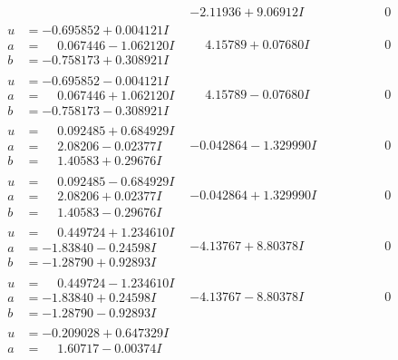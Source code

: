 \documentclass[1p]{elsarticle_modified}
\theoremstyle{definition}
\begin{document}
$$\begin{array}{c|c|c}
 & -2.11936 + 9.06912 I & \phantom{-0.000000 } 0 \\ \hline\begin{aligned}
u &= -0.695852 + 0.004121 I \\
a &= \phantom{-}0.067446 - 1.062120 I \\
b &= -0.758173 + 0.308921 I\end{aligned}
 & \phantom{-}4.15789 + 0.07680 I & \phantom{-0.000000 } 0 \\ \hline\begin{aligned}
u &= -0.695852 - 0.004121 I \\
a &= \phantom{-}0.067446 + 1.062120 I \\
b &= -0.758173 - 0.308921 I\end{aligned}
 & \phantom{-}4.15789 - 0.07680 I & \phantom{-0.000000 } 0 \\ \hline\begin{aligned}
u &= \phantom{-}0.092485 + 0.684929 I \\
a &= \phantom{-}2.08206 - 0.02377 I \\
b &= \phantom{-}1.40583 + 0.29676 I\end{aligned}
 & -0.042864 - 1.329990 I & \phantom{-0.000000 } 0 \\ \hline\begin{aligned}
u &= \phantom{-}0.092485 - 0.684929 I \\
a &= \phantom{-}2.08206 + 0.02377 I \\
b &= \phantom{-}1.40583 - 0.29676 I\end{aligned}
 & -0.042864 + 1.329990 I & \phantom{-0.000000 } 0 \\ \hline\begin{aligned}
u &= \phantom{-}0.449724 + 1.234610 I \\
a &= -1.83840 - 0.24598 I \\
b &= -1.28790 + 0.92893 I\end{aligned}
 & -4.13767 + 8.80378 I & \phantom{-0.000000 } 0 \\ \hline\begin{aligned}
u &= \phantom{-}0.449724 - 1.234610 I \\
a &= -1.83840 + 0.24598 I \\
b &= -1.28790 - 0.92893 I\end{aligned}
 & -4.13767 - 8.80378 I & \phantom{-0.000000 } 0 \\ \hline\begin{aligned}
u &= -0.209028 + 0.647329 I \\
a &= \phantom{-}1.60717 - 0.00374 I \\

\end{aligned}
\end{array}$$
\end{document}
